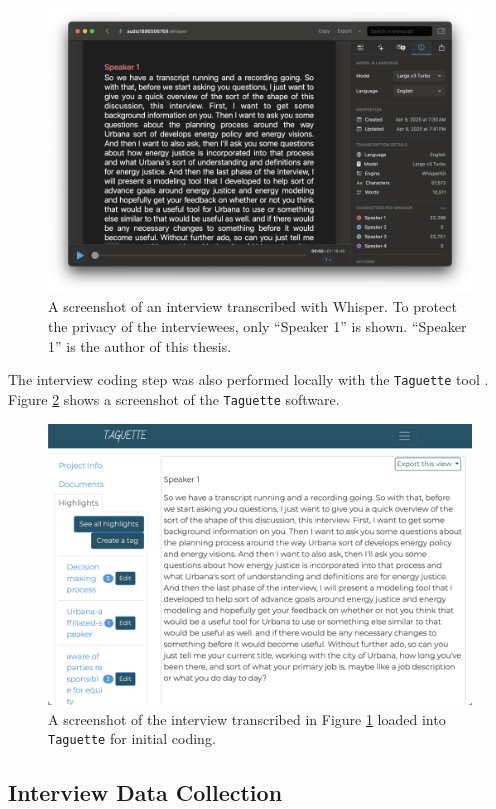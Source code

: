 \begin{figure}[htbp!]
    \centering
    \includegraphics[width=0.6\columnwidth]{figures/07_interview_chapter/whisper-screenshot.png}
    \caption{A screenshot of an interview transcribed with Whisper. To protect
    the privacy of the interviewees, only ``Speaker 1'' is shown. ``Speaker 1''
    is the author of this thesis.}
    \label{fig:whisper}
\end{figure}


The interview coding step was also performed locally with the \texttt{Taguette}
tool \cite{rampin_taguette_2021}. Figure \ref{fig:taguette} shows a screenshot
of the \texttt{Taguette} software.

\begin{figure}[htbp!]
    \centering
    \includegraphics[width=0.6\columnwidth]{figures/07_interview_chapter/taguette-screenshot}
    \caption{A screenshot of the interview transcribed in Figure \ref{fig:whisper}
    loaded into \texttt{Taguette} for initial coding.}
    \label{fig:taguette}
\end{figure}

\subsection{Interview Data Collection}

